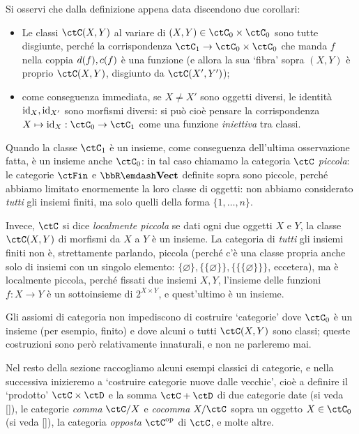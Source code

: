 \begin{remark}
    Si osservi che dalla definizione appena data discendono due corollari:
    \begin{itemize}
        \item Le classi $\Hom{\ctC}(X,Y)$ al variare di $(X,Y)\in\ctC_0\times\ctC_0$ sono tutte disgiunte, perché la corrispondenza $\ctC_1 \to \ctC_0\times\ctC_0$ che manda $f$ nella coppia $d(f),c(f)$ è una funzione (e allora la sua `fibra' sopra $(X,Y)$ è proprio $\Hom{\ctC}(X,Y)$, disgiunto da $\Hom{\ctC}(X',Y')$);
        \item come conseguenza immediata, se $X\ne X'$ sono oggetti diversi, le identità $\mathrm{id}_X,\mathrm{id}_{X'}$ sono morfismi diversi: si può cioè pensare la corrispondenza $X\mapsto \id_X : \ctC_0\to\ctC_1$ come una funzione \emph{iniettiva} tra classi.
    \end{itemize}
\end{remark}
\begin{definition}
    Quando la classe $\ctC_1$ è un insieme, come conseguenza dell'ultima osservazione fatta, è un insieme anche $\ctC_0$: in tal caso chiamamo la categoria $\ctC$ \emph{piccola}: le categorie $\ctFin$ e $\bbR\emdash\ctVect$ definite sopra sono piccole, perché abbiamo limitato enormemente la loro classe di oggetti: non abbiamo considerato \emph{tutti} gli insiemi finiti, ma solo quelli della forma $\{1,\dots,n\}$.

    Invece, $\ctC$ si dice \emph{localmente piccola} se dati ogni due oggetti $X$ e $Y$, la classe $\Hom{\ctC}(X,Y)$ di morfismi da $X$ a $Y$ è un insieme. La categoria di \emph{tutti} gli insiemi finiti non è, strettamente parlando, piccola (perché c'è una classe propria anche solo di insiemi con un singolo elemento: $\{\varnothing\},\{\{\varnothing\}\}, \{\{\{\varnothing\}\}\}$, eccetera), ma è localmente piccola, perché fissati due insiemi $X,Y$, l'insieme delle funzioni $f : X\to Y$ è un sottoinsieme di $2^{X\times Y}$, e quest'ultimo è un insieme.
\end{definition}
\begin{remark}
    Gli assiomi di categoria non impediscono di costruire `categorie' dove $\ctC_0$ è un insieme (per esempio, finito) e dove alcuni o tutti $\Hom{\ctC}(X,Y)$ sono classi; queste costruzioni sono però relativamente innaturali, e non ne parleremo mai.
\end{remark}
Nel resto della sezione raccogliamo alcuni esempi classici di categorie, e nella successiva inizieremo a `costruire categorie nuove dalle vecchie', cioè a definire il `prodotto' $\ctC\times\ctD$ e la somma $\ctC+\ctD$ di due categorie date (si veda \autoref{}), le categorie \emph{comma} $\ctC/X$ e \emph{cocomma} $X/\ctC$ sopra un oggetto $X\in\ctC_0$ (si veda \autoref{}), la categoria \emph{opposta} $\ctC^\op$ di $\ctC$, e molte altre.

